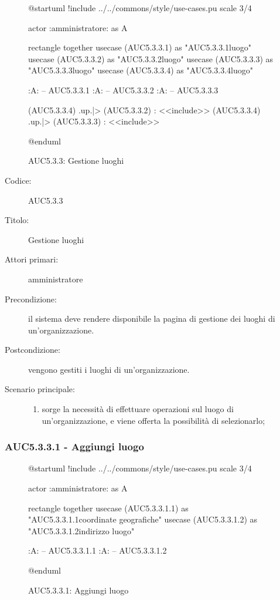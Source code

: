 \documentclass[../analisi-dei-requisiti.tex]{subfiles}
\begin{document}
\begin{figure}[h!]
  \centering
  \begin{plantuml}
  @startuml
  !include ../../commons/style/use-cases.pu
  scale 3/4

  actor :amministratore: as A

  rectangle {
    together {
      usecase (AUC5.3.3.1) as "AUC5.3.3.1\nAggiungi luogo"
      usecase (AUC5.3.3.2) as "AUC5.3.3.2\nEliminazione luogo"
      usecase (AUC5.3.3.3) as "AUC5.3.3.3\nModifica luogo"
    }
    usecase (AUC5.3.3.4) as "AUC5.3.3.4\nSeleziona luogo"
  }

  :A: -- AUC5.3.3.1
  :A: -- AUC5.3.3.2
  :A: -- AUC5.3.3.3

  (AUC5.3.3.4) .up.|> (AUC5.3.3.2) : <<include>>
  (AUC5.3.3.4) .up.|> (AUC5.3.3.3) : <<include>>

  @enduml
  \end{plantuml}
  \caption{AUC5.3.3: Gestione luoghi}
  \label{fig:AUC5_3_3}
\end{figure}

\begin{description}
  \item[Codice:] AUC5.3.3
  \item[Titolo:] Gestione luoghi
  \item[Attori primari:] amministratore
  \item[Precondizione:] il sistema deve rendere disponibile la pagina di gestione dei luoghi di un'organizzazione.
  \item[Postcondizione:] vengono gestiti i luoghi di un'organizzazione.
  \item[Scenario principale:]
  \begin{enumerate}
    \item sorge la necessità di effettuare operazioni sul luogo di un'organizzazione, e viene offerta la possibilità di selezionarlo;
  \end{enumerate}
\end{description}

\subsubsection{AUC5.3.3.1 - Aggiungi luogo}%
\label{subsub:AUC5.3.3.1}

\begin{figure}[h!]
  \centering
  \begin{plantuml}
  @startuml
  !include ../../commons/style/use-cases.pu
  scale 3/4

  actor :amministratore: as A

  rectangle {
    together {
      usecase (AUC5.3.3.1.1) as "AUC5.3.3.1.1\nInserisci coordinate geografiche"
      usecase (AUC5.3.3.1.2) as "AUC5.3.3.1.2\nInserisci indirizzo luogo"
    }
  }

  :A: -- AUC5.3.3.1.1
  :A: -- AUC5.3.3.1.2

  @enduml
  \end{plantuml}
  \caption{AUC5.3.3.1: Aggiungi luogo}
  \label{fig:AUC5_3_3_1}
\end{figure}
\end{document}
